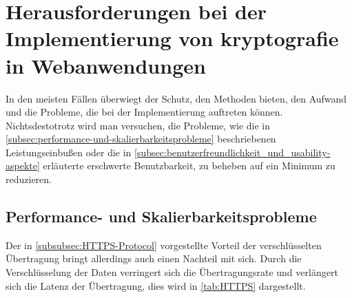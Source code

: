\newpage
\section[Herausforderungen bei der Implementierung von \gls{kryptografie} in Webanwendungen]{Herausforderungen bei der Implementierung von \gls{kryptografie} in Webanwendungen}\label{sec:Herausforderung-bei-der-implementierung-von-kryptografie-in-webanwendungen}
In den meisten Fällen überwiegt der Schutz, den  Methoden bieten, den Aufwand und die Probleme, die bei der Implementierung auftreten können. Nichtsdestotrotz wird man versuchen, die Probleme, wie \zb die in \autoref{subsec:performance-und-skalierbarkeitsprobleme} beschriebenen Leistungseinbußen oder die in \autoref{subsec:benutzerfreundlichkeit_und_usability-aspekte} erläuterte erschwerte Benutzbarkeit, zu beheben \bzw auf ein Minimum zu reduzieren.

\subsection{Performance- und Skalierbarkeitsprobleme}\label{subsec:performance-und-skalierbarkeitsprobleme}
Der in \autoref{subsubsec:HTTPS-Protocol} vorgestellte Vorteil der verschlüsselten Übertragung bringt allerdings auch einen Nachteil mit sich. Durch die Verschlüsselung der Daten verringert sich die Übertragungsrate und verlängert sich die Latenz der Übertragung\autocite[]{goldberg_comparison_nodate}, dies wird in \autoref{tab:HTTPS}\autocite[Übersetzt nach:][]{goldberg_comparison_nodate} dargestellt.

